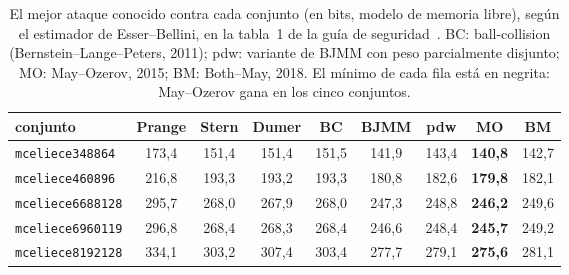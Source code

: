 \begin{table}[htbp]
\centering
\footnotesize
\setlength{\tabcolsep}{4pt}
\begin{tabular}{lcccccccc}
\toprule
conjunto & Prange & Stern & Dumer & BC & BJMM & pdw & MO & BM\\
\midrule
\texttt{mceliece348864} & 173{,}4 & 151{,}4 & 151{,}4 & 151{,}5 & 141{,}9 & 143{,}4 & \textbf{140{,}8} & 142{,}7\\
\texttt{mceliece460896} & 216{,}8 & 193{,}3 & 193{,}2 & 193{,}3 & 180{,}8 & 182{,}6 & \textbf{179{,}8} & 182{,}1\\
\texttt{mceliece6688128} & 295{,}7 & 268{,}0 & 267{,}9 & 268{,}0 & 247{,}3 & 248{,}8 & \textbf{246{,}2} & 249{,}6\\
\texttt{mceliece6960119} & 296{,}8 & 268{,}4 & 268{,}3 & 268{,}4 & 246{,}6 & 248{,}4 & \textbf{245{,}7} & 249{,}2\\
\texttt{mceliece8192128} & 334{,}1 & 303{,}2 & 307{,}4 & 303{,}4 & 277{,}7 & 279{,}1 & \textbf{275{,}6} & 281{,}1\\
\bottomrule
\end{tabular}
\caption{El mejor ataque conocido contra cada conjunto (en bits, modelo
de memoria libre), según el estimador de Esser--Bellini, en la
tabla~1 de la guía de seguridad~\cite{cmsecurity}. BC: ball-collision
(Bernstein--Lange--Peters, 2011); pdw: variante de BJMM con peso
parcialmente disjunto; MO: May--Ozerov, 2015; BM: Both--May, 2018. El
mínimo de cada fila está en negrita: May--Ozerov gana en los cinco
conjuntos.}
\label{tab:isd-guia}
\end{table}

